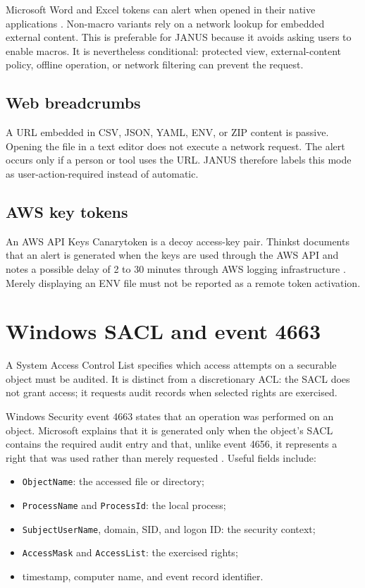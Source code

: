 Microsoft Word and Excel tokens can alert when opened in their native
applications \cite{canaryOffice}. Non-macro variants rely on a network lookup
for embedded external content. This is preferable for JANUS because it avoids
asking users to enable macros. It is nevertheless conditional: protected view,
external-content policy, offline operation, or network filtering can prevent
the request.

\subsection{Web breadcrumbs}

A URL embedded in CSV, JSON, YAML, ENV, or ZIP content is passive. Opening the
file in a text editor does not execute a network request. The alert occurs only
if a person or tool uses the URL. JANUS therefore labels this mode as
user-action-required instead of automatic.

\subsection{AWS key tokens}

An AWS API Keys Canarytoken is a decoy access-key pair. Thinkst documents that
an alert is generated when the keys are used through the AWS API and notes a
possible delay of 2 to 30 minutes through AWS logging infrastructure
\cite{canaryAws}. Merely displaying an ENV file must not be reported as a
remote token activation.

\section{Windows SACL and event 4663}

A System Access Control List specifies which access attempts on a securable
object must be audited. It is distinct from a discretionary ACL: the SACL does
not grant access; it requests audit records when selected rights are exercised.

Windows Security event 4663 states that an operation was performed on an
object. Microsoft explains that it is generated only when the object's SACL
contains the required audit entry and that, unlike event 4656, it represents a
right that was used rather than merely requested \cite{microsoft4663}. Useful
fields include:

\begin{itemize}
  \item \texttt{ObjectName}: the accessed file or directory;
  \item \texttt{ProcessName} and \texttt{ProcessId}: the local process;
  \item \texttt{SubjectUserName}, domain, SID, and logon ID: the security
  context;
  \item \texttt{AccessMask} and \texttt{AccessList}: the exercised rights;
  \item timestamp, computer name, and event record identifier.
\end{itemize}


